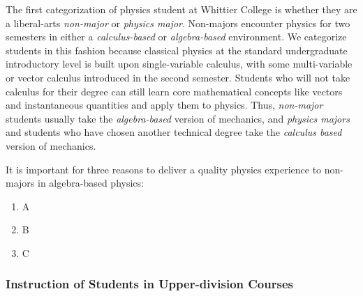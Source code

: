 \documentclass[../../main.tex]{subfiles}
\begin{document}
The first categorization of physics student at Whittier College is whether they are a liberal-arts \textit{non-major} or \textit{physics major}.  Non-majors encounter physics for two semesters in either a \textit{calculus-based} or \textit{algebra-based} environment.  We categorize students in this fashion because classical physics at the standard undergraduate introductory level is built upon single-variable calculus, with some multi-variable or vector calculus introduced in the second semester.  Students who will not take calculus for their degree can still learn core mathematical concepts like vectors and instantaneous quantities and apply them to physics.  Thus, \textit{non-major} students usually take the \textit{algebra-based} version of mechanics, and \textit{physics majors} and students who have chosen another technical degree take the \textit{calculus based} version of mechanics.  \\ \hspace{0.1cm}

It is important for three reasons to deliver a quality physics experience to non-majors in algebra-based physics:
\begin{enumerate}
\item A
\item B
\item C
\end{enumerate}

\subsubsection{Instruction of Students in Upper-division Courses}
\end{document}
